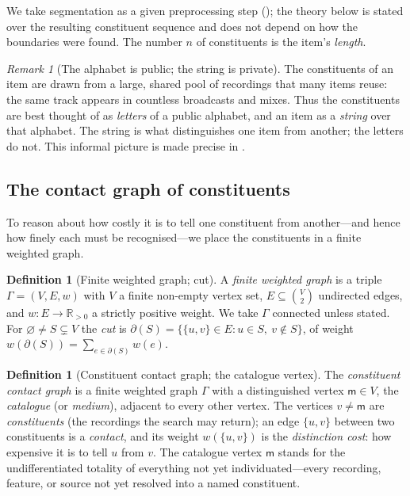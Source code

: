 \documentclass[11pt,twocolumn,a4paper]{article}
\theoremstyle{thmstyle}
\theoremstyle{definition}
\newtheorem{definition}[theorem]{Definition}
\theoremstyle{remark}
\newtheorem{remark}[theorem]{Remark}
\newcommand{\R}{\mathbb{R}}
\newcommand{\Gph}{\Gamma}
\newcommand{\V}{V}
\newcommand{\E}{E}
\newcommand{\wt}{w}
\newcommand{\med}{\mathsf{m}}
\newcommand{\cut}{\partial}
\begin{document}
We take segmentation as a given preprocessing step (); the
theory below is stated over the resulting constituent sequence and does not
depend on how the boundaries were found. The number $n$ of constituents is the
item's \emph{length}.

\begin{remark}[The alphabet is public; the string is private]
\label{rem:alphabet}
The constituents of an item are drawn from a large, shared pool of recordings
that many items reuse: the same track appears in countless broadcasts and mixes.
Thus the constituents are best thought of as \emph{letters} of a public
alphabet, and an item as a \emph{string} over that alphabet. The string is what
distinguishes one item from another; the letters do not. This informal picture
is made precise in .
\end{remark}

\subsection{The contact graph of constituents}

To reason about how costly it is to tell one constituent from another---and
hence how finely each must be recognised---we place the constituents in a finite
weighted graph.

\begin{definition}[Finite weighted graph; cut]
\label{def:graph}
A \emph{finite weighted graph} is a triple $\Gph=(\V,\E,\wt)$ with $\V$ a finite
non-empty vertex set, $\E\subseteq\binom{\V}{2}$ undirected edges, and
$\wt\colon\E\to\R_{>0}$ a strictly positive weight. We take $\Gph$ connected
unless stated. For $\varnothing\neq S\subsetneq\V$ the \emph{cut} is
$\cut(S)=\{\{u,v\}\in\E:u\in S,\ v\notin S\}$, of weight
$\wt(\cut(S))=\sum_{e\in\cut(S)}\wt(e)$.
\end{definition}

\begin{definition}[Constituent contact graph; the catalogue vertex]
\label{def:contact}
The \emph{constituent contact graph} is a finite weighted graph $\Gph$ with a
distinguished vertex $\med\in\V$, the \emph{catalogue} (or \emph{medium}),
adjacent to every other vertex. The vertices $v\neq\med$ are \emph{constituents}
(the recordings the search may return); an edge $\{u,v\}$ between two
constituents is a \emph{contact}, and its weight $\wt(\{u,v\})$ is the
\emph{distinction cost}: how expensive it is to tell $u$ from $v$. The catalogue
vertex $\med$ stands for the undifferentiated totality of everything not yet
individuated---every recording, feature, or source not yet resolved into a named
constituent.
\end{definition}
\end{document}
